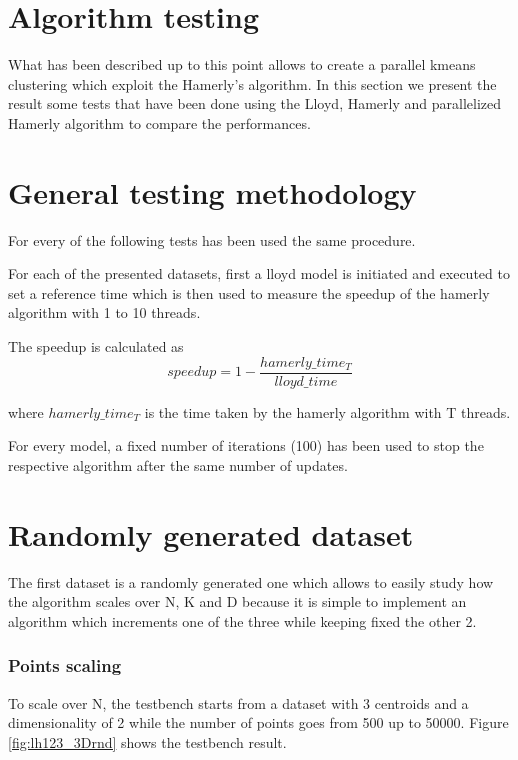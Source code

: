 \documentclass{report}
\begin{document}
\begin{minipage}[b]{0.48\textwidth}
  \section*{Algorithm testing}
  What has been described up to this point allows to create a parallel kmeans clustering which exploit the Hamerly's algorithm. In this section we present the result some tests that have been done using the Lloyd, Hamerly and parallelized Hamerly algorithm to compare the performances.

  \section*{General testing methodology}
  For every of the following tests has been used the same procedure.

  For each of the presented datasets, first a lloyd model is initiated and executed to set a reference time which is then used to measure the speedup of the hamerly algorithm with 1 to 10 threads. 
  
  The speedup is calculated as
  \begin{equation}
    speedup = 1 - \frac{hamerly\_time_T}{lloyd\_time}
  \end{equation}

  where $hamerly\_time_T$ is the time taken by the hamerly algorithm with T threads.

  For every model, a fixed number of iterations (100) has been used to stop the respective algorithm after the same number of updates.
  
  \section*{Randomly generated dataset }
  The first dataset is a randomly generated one which allows to easily study how the algorithm scales over N, K and D because it is simple to implement an algorithm which increments one of the three while keeping fixed the other 2.

  \subsubsection*{Points scaling}
  To scale over N, the testbench starts from a dataset with 3 centroids and a dimensionality of 2 while the number of points goes from 500 up to 50000. Figure \ref{fig:lh123_3Drnd} shows the testbench result.


\end{minipage}
\end{document}
